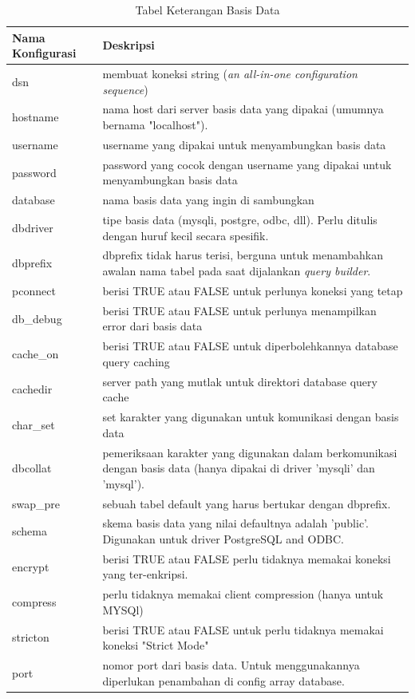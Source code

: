 	\begin{table}[H]
		\centering
		\caption{Tabel Keterangan Basis Data}
	\begin{tabular}{| m{5cm} | m{10cm} |}
		\hline
		Nama Konfigurasi & Deskripsi\\
		\hline
		dsn & membuat koneksi string  (\textit{an all-in-one configuration sequence})\\
		\hline
		hostname & nama host dari server basis data yang dipakai (umumnya bernama "localhost").\\
		\hline
		username & username yang dipakai untuk menyambungkan basis data\\
		\hline
		password & password yang cocok dengan username yang dipakai untuk menyambungkan basis data\\
		\hline
		database & nama basis data yang ingin di sambungkan\\
		\hline
		dbdriver & tipe basis data (mysqli, postgre, odbc, dll). Perlu ditulis dengan huruf kecil secara spesifik.\\
		\hline
		dbprefix & dbprefix tidak harus terisi, berguna untuk menambahkan awalan nama tabel pada saat dijalankan \textit{query builder}.\\
		\hline
		pconnect & berisi TRUE atau FALSE untuk perlunya koneksi yang tetap\\
		\hline
		db\_debug & berisi TRUE atau FALSE untuk perlunya menampilkan error dari basis data\\
		\hline
		cache\_on & berisi TRUE atau FALSE untuk diperbolehkannya database query caching\\
		\hline
		cachedir & server path yang mutlak untuk direktori database query cache\\
		\hline
		char\_set & set karakter yang digunakan untuk komunikasi dengan basis data\\
		\hline
		dbcollat & pemeriksaan karakter yang digunakan dalam berkomunikasi dengan basis data (hanya dipakai di driver 'mysqli' dan 'mysql').\\
		\hline
		swap\_pre & sebuah tabel default yang harus bertukar dengan dbprefix.\\
		\hline
		schema & skema basis data yang nilai defaultnya adalah 'public'. Digunakan untuk driver PostgreSQL and ODBC.\\
		\hline
		encrypt &  berisi TRUE atau FALSE perlu tidaknya memakai koneksi yang ter-enkripsi.\\
		\hline
		compress & perlu tidaknya memakai client compression (hanya untuk MYSQl)\\
		\hline
		stricton &  berisi TRUE atau FALSE untuk perlu tidaknya memakai koneksi "Strict Mode" \\
		\hline
		port & nomor port dari basis data. Untuk menggunakannya diperlukan penambahan di config array database.\\
		\hline
	\end{tabular}
\end{table}
	

